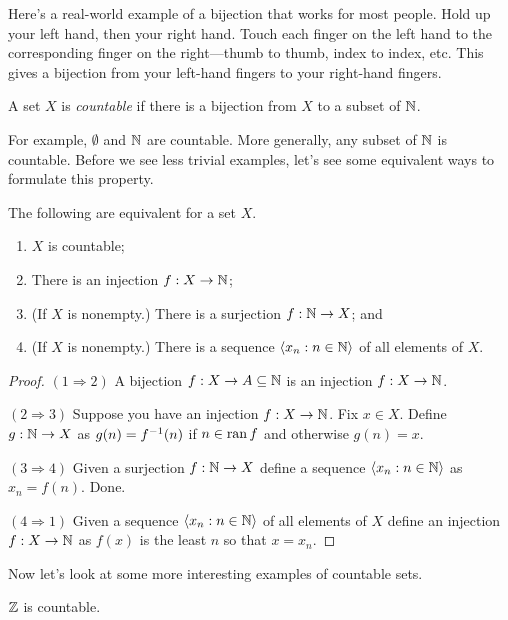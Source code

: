 \documentclass[10pt]{amsart}
\begin{document}
Here's a real-world example of a bijection that works for most people. Hold up your left hand, then your right hand. Touch each finger on the left hand to the corresponding finger on the right---thumb to thumb, index to index, etc. This gives a bijection from your left-hand fingers to your right-hand fingers.

\begin{definition}
A set $X$ is \emph{countable} if there is a bijection from $X$ to a subset of $\mathbb{N}$.
\end{definition}

For example, $\emptyset$ and $\mathbb{N}$ are countable. More generally, any subset of $\mathbb{N}$ is countable. Before we see less trivial examples, let's see some equivalent ways to formulate this property.

\begin{lemma}
The following are equivalent for a set $X$.
\begin{enumerate}
\item $X$ is countable;
\item There is an injection $f : X \to \mathbb{N}$;
\item (If $X$ is nonempty.) There is a surjection $f : \mathbb{N} \to X$; and
\item (If $X$ is nonempty.) There is a sequence ${\left\langle x_n : n \in \mathbb{N} \right\rangle}$ of all elements of $X$.
\end{enumerate}
\end{lemma}

\begin{proof}
$(1 \Rightarrow 2)$ A bijection $f : X \to A \subseteq \mathbb{N}$ is an injection $f : X \to \mathbb{N}$.

$(2 \Rightarrow 3)$ Suppose you have an injection $f : X \to \mathbb{N}$. Fix $x \in X$. Define $g : \mathbb{N} \to X$ as $g(n) = f^{-1}(n)$ if $n \in \operatorname{ran} f$ and otherwise $g(n) = x$.

$(3 \Rightarrow 4)$ Given a surjection $f : \mathbb{N} \to X$ define a sequence ${\left\langle x_n : n \in \mathbb{N} \right\rangle}$ as $x_n = f(n)$. Done.

$(4 \Rightarrow 1)$ Given a sequence ${\left\langle x_n : n \in \mathbb{N} \right\rangle}$ of all elements of $X$ define an injection $f : X \to \mathbb{N}$ as $f(x)$ is the least $n$ so that $x = x_n$.
\end{proof}

Now let's look at some more interesting examples of countable sets.

\begin{proposition}
$\mathbb{Z}$ is countable.
\end{proposition}
\end{document}
